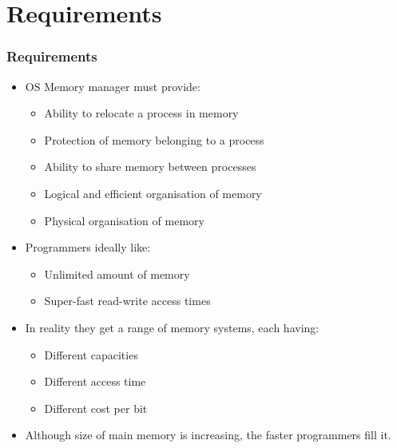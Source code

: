 \documentclass{beamer}
\begin{document}
\section{Requirements}
\begin{frame}
\frametitle{Requirements}
\begin{itemize}
\item OS Memory manager must provide:
\begin{itemize}
\item Ability to relocate a process in memory
\item Protection of memory belonging to a process
\item Ability to share memory between processes
\item Logical and efficient organisation of memory
\item Physical organisation of memory
\end{itemize}
\item Programmers ideally like:
\begin{itemize}
\item Unlimited amount of memory
\item Super-fast read-write access times
\end{itemize}
\item In reality they get a range of memory systems, each having:
\begin{itemize}
\item Different capacities
\item Different access time
\item Different cost per bit
\end{itemize}
\item Although size of main memory is increasing, the faster programmers fill it.
\end{itemize}
\end{frame}
\end{document}
